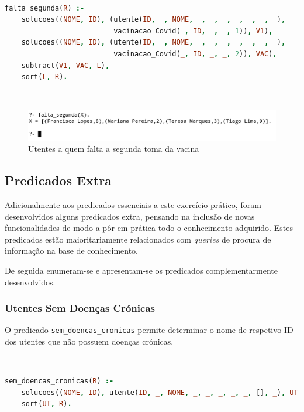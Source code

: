 \documentclass[a4paper, 11pt]{article}
\begin{document}
\

\begin{lstlisting}[language=Prolog, caption={Extensão do predicado \texttt{falta\_segunda}}]
% Extensao do predicado falta_segunda: R -> {V, F}
falta_segunda(R) :- 
    solucoes((NOME, ID), (utente(ID, _, NOME, _, _, _, _, _, _, _),
                          vacinacao_Covid(_, ID, _, _, 1)), V1),
    solucoes((NOME, ID), (utente(ID, _, NOME, _, _, _, _, _, _, _),
                          vacinacao_Covid(_, ID, _, _, 2)), VAC),
    subtract(V1, VAC, L),
    sort(L, R).
\end{lstlisting}

\

\begin{figure}[H]
    \centering
    \includegraphics[width=.9\textwidth]{img/falta_segunda.png}
    \caption{Utentes a quem falta a segunda toma da vacina}
\end{figure}

\subsection{Predicados Extra}

Adicionalmente aos predicados essenciais a este exercício prático, foram desenvolvidos alguns predicados extra, pensando
na inclusão de novas funcionalidades de modo a pôr em prática todo o conhecimento adquirido. Estes predicados estão
maioritariamente relacionados com \textit{queries} de procura de informação na base de conhecimento.

De seguida enumeram-se e apresentam-se os predicados complementarmente desenvolvidos.

\subsubsection{Utentes Sem Doenças Crónicas}

O predicado \texttt{sem\_doencas\_cronicas} permite determinar o nome de respetivo ID dos utentes que não possuem
doenças crónicas.

\

\begin{lstlisting}[language=Prolog, caption={Extensão do predicado \texttt{sem\_doencas\_cronicas}}]
% Extensao do predicado sem_doencas_cronicas: R -> {V, F}
sem_doencas_cronicas(R) :- 
    solucoes((NOME, ID), utente(ID, _, NOME, _, _, _, _, _, [], _), UT),
    sort(UT, R).
\end{lstlisting}
\end{document}
